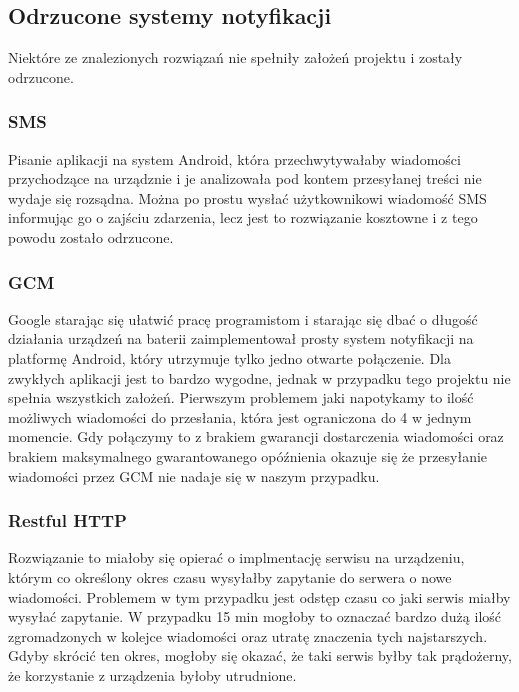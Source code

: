 \documentclass[twoside]{article}
\begin{document}
\begin{multicols}{2}
\section{Odrzucone systemy notyfikacji}
Niektóre ze znalezionych rozwiązań nie spełniły założeń projektu i zostały odrzucone.
\subsubsection{SMS}
Pisanie aplikacji na system Android, która przechwytywałaby wiadomości przychodzące na urządznie i je analizowała pod kontem przesyłanej treści nie wydaje się rozsądna. Można po prostu wysłać użytkownikowi wiadomość SMS informując go o zajściu zdarzenia, lecz jest to rozwiązanie kosztowne i z tego powodu zostało odrzucone.

\subsubsection{GCM}
Google starając się ułatwić pracę programistom i starając się dbać o długość działania urządzeń na baterii zaimplementował prosty system notyfikacji na platformę Android, który utrzymuje tylko jedno otwarte połączenie. Dla zwykłych aplikacji jest to bardzo wygodne, jednak w przypadku tego projektu nie spełnia wszystkich założeń. Pierwszym problemem jaki napotykamy to ilość możliwych wiadomości do przesłania, która jest ograniczona do 4 w jednym momencie. Gdy połączymy to z brakiem gwarancji dostarczenia wiadomości oraz brakiem maksymalnego gwarantowanego opóźnienia okazuje się że przesyłanie wiadomości przez GCM nie nadaje się w naszym przypadku.

\subsubsection{Restful HTTP}
Rozwiązanie to miałoby się opierać o implmentację serwisu na urządzeniu, którym co określony okres czasu wysyłałby zapytanie do serwera o nowe wiadomości. Problemem w tym przypadku jest odstęp czasu co jaki serwis miałby wysyłać zapytanie. W przypadku 15 min mogłoby to oznaczać bardzo dużą ilość zgromadzonych w kolejce wiadomości oraz utratę znaczenia tych najstarszych. Gdyby skrócić ten okres, mogłoby się okazać, że taki serwis byłby tak prądożerny, że korzystanie z urządzenia byłoby utrudnione.



\end{multicols}
\end{document}

